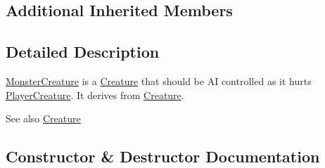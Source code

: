 \subsection*{Additional Inherited Members}


\subsection{Detailed Description}
\hyperlink{class_monster_creature}{Monster\+Creature} is a \hyperlink{class_creature}{Creature} that should be AI controlled as it hurts \hyperlink{class_player_creature}{Player\+Creature}. It derives from \hyperlink{class_creature}{Creature}. \begin{DoxySeeAlso}{See also}
\hyperlink{class_creature}{Creature} 
\end{DoxySeeAlso}


\subsection{Constructor \& Destructor Documentation}
